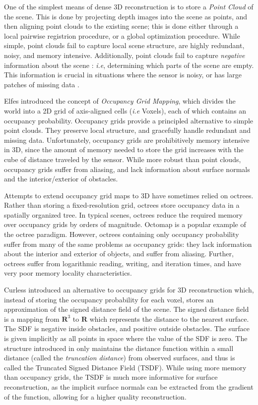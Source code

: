 \documentclass[conference,10pt]{IEEEtran}
\begin{document}
One of the simplest means of dense 3D reconstruction is to  store a \emph{Point
Cloud} of the scene. This is done by projecting depth images into the scene as
points, and then aligning point clouds to the existing scene; this is done
either through a local pairwise registrion procedure, or a global optimization
procedure. While simple, point clouds fail to capture local scene structure, are highly 
redundant, noisy, and memory intensive.  Additionally, point clouds fail to
capture \emph{negative} information about the scene :  \emph{i.e}, determining
which parts of the scene are empty.  This information is crucial in situations
where the sensor is noisy, or has large patches of missing data \cite{Klingensmith2014}.

Elfes \cite{Elfes1989} introduced the concept of \emph{Occupancy Grid
Mapping}, which divides the world into a 2D grid of axis-aligned cells
(\emph{i.e} Voxels), each of which contains an occupancy probability. Occupancy
grids provide a principled alternative to simple point clouds. They preserve local
structure, and gracefully handle redundant and missing data.
Unfortunately, occupancy grids are prohibitively memory intensive in 3D, since
the amount of memory needed to store the grid increases with the cube of distance 
traveled by the sensor. While more robust than point clouds, occupancy grids
suffer from aliasing, and lack information about surface normals and the
interior/exterior of obstacles.

Attempts to extend occupancy grid maps to 3D have sometimes relied on octrees.
Rather than storing a fixed-resolution grid, octrees store occupancy data in a
spatially organized tree. In typical scenes, octrees reduce the required memory
over occupancy grids by orders of magnitude. Octomap \cite{Wurm2010} is a
popular example of the octree paradigm. However, octrees containing only
occupancy probability suffer from many of the same problems as occupancy grids:
they lack information about the interior and exterior of objects, and suffer
from aliasing. Further, octrees suffer from logarithmic reading, writing, and
iteration times, and have very poor memory locality characteristics.

Curless \cite{Curless1996} introduced an alternative to occupancy grids for 3D
reconstruction which, instead of storing the occupancy probability for each
voxel, stores an approximation of the signed distance field of the scene. The signed distance
field is a mapping from $\mathbf{R}^3$ to $\mathbf{R}$ which represents the
distance to the nearest surface. The SDF is negative inside obstacles, and
positive outside obstacles. The surface is given implicitly as all points in
space where the value of the SDF is zero. The structure introduced in
\cite{Curless1996} only maintains the distance function within a small distance 
(called the \emph{truncation distance}) from observed surfaces, and thus is called the
Truncated Signed Distance Field (TSDF).  While using more memory than occupancy
grids, the TSDF is much more informative for surface reconstruction, as the
implicit surface normals can be extracted from the gradient of the function,
allowing for a higher quality reconstruction.
\end{document}
